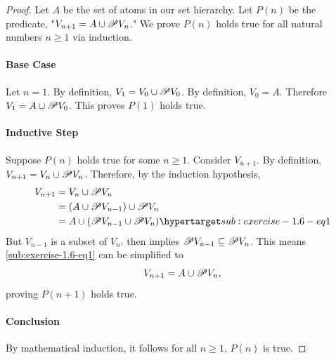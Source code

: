 \documentclass{report}
\begin{document}
  \begin{proof}

    Let $A$ be the set of atoms in our set hierarchy.
    Let $P(n)$ be the predicate, "$V_{n + 1} = A \cup \mathscr{P}V_n$."
    We prove $P(n)$ holds true for all natural numbers $n \geq 1$ via induction.

    \paragraph{Base Case}%

      Let $n = 1$.
      By definition, $V_1 = V_0 \cup \mathscr{P}V_0$.
      By definition, $V_0 = A$.
      Therefore $V_1 = A \cup \mathscr{P}V_0$.
      This proves $P(1)$ holds true.

    \paragraph{Inductive Step}%

      Suppose $P(n)$ holds true for some $n \geq 1$.
      Consider $V_{n+1}$.
      By definition, $V_{n+1} = V_n \cup \mathscr{P}V_n$.
      Therefore, by the induction hypothesis,
        \begin{align}
          V_{n+1}
            & = V_n \cup \powerset{V_n}
              \nonumber \\
            & = (A \cup \powerset{V_{n-1}}) \cup \powerset{V_n}
              \nonumber \\
            & = A \cup (\powerset{V_{n-1}} \cup \powerset{V_n})
              \hyperlabel{sub:exercise-1.6-eq1}
        \end{align}
      But $V_{n-1}$ is a subset of $V_n$.
       then implies
        $\mathscr{P}V_{n-1} \subseteq \mathscr{P}V_n$.
      This means \eqref{sub:exercise-1.6-eq1} can be simplified to
        $$V_{n+1} = A \cup \mathscr{P}V_n,$$
      proving $P(n+1)$ holds true.

    \paragraph{Conclusion}%

      By mathematical induction, it follows for all $n \geq 1$, $P(n)$ is true.

  \end{proof}

\subsection{}%
\end{document}
